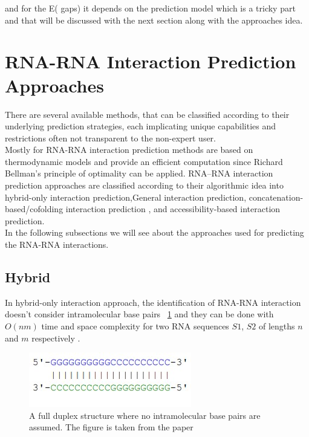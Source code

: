 \documentclass[twoside,a4paper]{report}
\begin{document}
	and for the E( gaps) it depends on the prediction model which is a tricky part and that will be discussed with the next section along with the approaches idea.
	
	
	\section{RNA-RNA Interaction Prediction Approaches}
	There are several available methods, that can be classified according to their underlying prediction strategies, each implicating unique capabilities and restrictions often not transparent to the non-expert user.\\ 
	Mostly for RNA-RNA interaction prediction methods are based on thermodynamic models and provide an efficient computation since Richard Bellman’s principle of optimality \citep{raden2018interactive} can be applied. RNA–RNA interaction prediction approaches are classified according to their algorithmic idea into hybrid-only interaction prediction,General interaction prediction, concatenation-based/cofolding interaction prediction , and accessibility-based interaction prediction. \\
	In the following subsections we will see about the approaches used for predicting the RNA-RNA interactions.\\

	
	\subsection{Hybrid}
	In hybrid-only interaction approach, the identification of RNA-RNA interaction doesn't consider intramolecular base pairs ~\ref{fig:rnahybrid} and they can be done with $O(nm)$ time and space complexity for two RNA sequences $S1$, $S2$ of lengths $n$ and $m$ respectively \citep{tjaden2006target}.\\
	
	\begin{figure}[H]
		\includegraphics[width=0.4\linewidth]{rnahybrid}
		\centering
		\caption{ A full duplex structure where no intramolecular base pairs are assumed. The figure is taken from the paper \citep{wright2018structure}} 
		\label{fig:rnahybrid}
	\end{figure}
	
\end{document}
